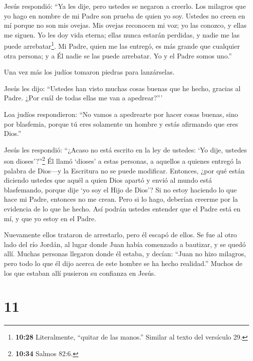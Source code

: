  Jesús respondió: ``Ya les dije, pero ustedes se negaron a
creerlo. Los milagros que yo hago en nombre de mi Padre son prueba de
quien yo soy.  Ustedes no creen en mí porque no son mis
ovejas.  Mis ovejas reconocen mi voz; yo las conozco, y
ellas me siguen.  Yo les doy vida eterna; ellas nunca
estarán perdidas, y nadie me las puede arrebatar\footnote{\textbf{10:28}
  Literalmente, ``quitar de las manos.'' Similar al texto del versículo
  29.}.  Mi Padre, quien me las entregó, es más grande que
cualquier otra persona; y a Él nadie se las puede arrebatar.
 Yo y el Padre somos uno.''

 Una vez más los judíos tomaron piedras para lanzárselas.

 Jesús les dijo: ``Ustedes han visto muchas cosas buenas
que he hecho, gracias al Padre. ¿Por cuál de todas ellas me van a
apedrear?'''

 Loa judíos respondieron: ``No vamos a apedrearte por hacer
cosas buenas, sino por blasfemia, porque tú eres solamente un hombre y
estás afirmando que eres Dios.''

 Jesús les respondió: ``¿Acaso no está escrito en la ley de
ustedes: `Yo dije, ustedes son dioses'?''\footnote{\textbf{10:34} Salmos
  82:6.}  Él llamó `dioses' a estas personas, a aquellos a
quienes entregó la palabra de Dios---y la Escritura no se puede
modificar.  Entonces, ¿por qué están diciendo ustedes que
aquél a quien Dios apartó y envió al mundo está blasfemando, porque dije
`yo soy el Hijo de Dios'?  Si no estoy haciendo lo que hace
mi Padre, entonces no me crean.  Pero si lo hago, deberían
creerme por la evidencia de lo que he hecho. Así podrán ustedes entender
que el Padre está en mí, y que yo estoy en el Padre.

 Nuevamente ellos trataron de arrestarlo, pero él escapó de
ellos.  Se fue al otro lado del río Jordán, al lugar donde
Juan había comenzado a bautizar, y se quedó allí.  Muchas
personas llegaron donde él estaba, y decían: ``Juan no hizo milagros,
pero todo lo que él dijo acerca de este hombre se ha hecho realidad.''
 Muchos de los que estaban allí pusieron su confianza en
Jesús.

\hypertarget{section-10}{%
\section{11}\label{section-10}}

